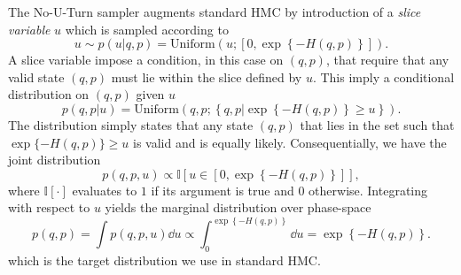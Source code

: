 The No-U-Turn sampler augments standard HMC by introduction of a \textit{slice variable} $u$ which is sampled according to
\begin{equation}
    u \sim p(u|q, p) = \text{Uniform}\left(u; \left[0, \exp\left\{-H(q, p)\right\}\right]\right).
\end{equation} 
A slice variable impose a condition, in this case on $(q, p)$, that require that any valid state $(q, p)$ must lie within the slice defined by $u$. This imply a conditional distribution on $(q, p)$ given $u$
\begin{equation}
    p(q, p|u) = \text{Uniform}\left( q, p; \left\{q, p \bigg| \exp\left\{-H(q, p)\right\} \geq u \right\} \right).
\end{equation}
The distribution simply states that any state $(q, p)$ that lies in the set such that $\exp\{-H(q, p)\} \geq u$ is valid and is equally likely.
Consequentially, we have the joint distribution 
\begin{equation}
    p(q, p, u) \propto \mathbb{I}\left[u \in \left[0, \exp\left\{-H(q, p)\right\}\right]\right],
\end{equation}
where $\mathbb{I}[\cdot]$ evaluates to $1$ if its argument is true and $0$ otherwise. 
Integrating with respect to $u$ yields the marginal distribution
over phase-space
\begin{equation}
    p(q, p) = \int p(q, p, u) \dd u \propto \int_0^{\exp\left\{-H(q, p)\right\}}\dd u = \exp\left\{-H(q, p)\right\}.
\end{equation}
which is the target distribution we use in standard HMC.
